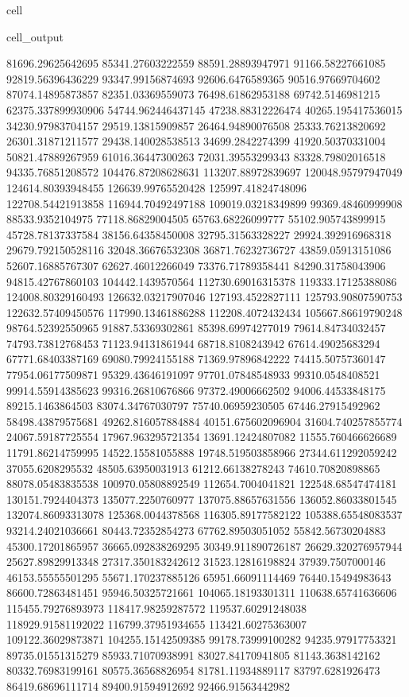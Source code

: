 \documentclass[letterpaper,10pt,english]{jupyterBook}
\begin{document}
\begin{sphinxuseclass}{cell}
\begin{sphinxVerbatimOutput}
\begin{sphinxuseclass}{cell_output}
\begin{sphinxVerbatim}[commandchars=\\\{\}]
81696.29625642695  85341.27603222559  88591.28893947971  91166.58227661085  92819.56396436229  93347.99156874693  92606.6476589365  90516.97669704602  87074.14895873857  82351.03369559073  76498.61862953188  69742.5146981215  62375.337899930906  54744.962446437145  47238.88312226474  40265.195417536015  34230.97983704157  29519.13815909857  26464.94890076508  25333.76213820692  26301.31871211577  29438.140028538513  34699.2842274399  41920.50370331004  50821.47889267959  61016.36447300263  72031.39553299343  83328.79802016518  94335.76851208572  104476.87208628631  113207.88972839697  120048.95797947049  124614.80393948455  126639.99765520428  125997.41824748096  122708.54421913858  116944.70492497188  109019.03218349899  99369.48460999908  88533.9352104975  77118.86829004505  65763.68226099777  55102.905743899915  45728.78137337584  38156.64358450008  32795.31563328227  29924.392916968318  29679.792150528116  32048.36676532308  36871.76232736727  43859.05913151086  52607.16885767307  62627.46012266049  73376.71789358441  84290.31758043906  94815.42767860103  104442.1439570564  112730.69016315378  119333.17125388086  124008.80329160493  126632.03217907046  127193.4522827111  125793.90807590753  122632.57409450576  117990.13461886288  112208.4072432434  105667.86619790248  98764.52392550965  91887.53369302861  85398.69974277019  79614.84734032457  74793.73812768453  71123.94131861944  68718.8108243942  67614.49025683294  67771.68403387169  69080.79924155188  71369.97896842222  74415.50757360147  77954.06177509871  
95329.43646191097  97701.07848548933  99310.0548408521  99914.55914385623  99316.26810676866  97372.49006662502  94006.44533848175  89215.1463864503  83074.34767030797  75740.06959230505  67446.27915492962  58498.43879575681  49262.816057884884  40151.675602096904  31604.740257855774  24067.59187725554  17967.963295721354  13691.12424807082  11555.760466626689  11791.86214759995  14522.15581055888  19748.519503858966  27344.611292059242  37055.6208295532  48505.63950031913  61212.66138278243  74610.70820898865  88078.05483835538  100970.05808892549  112654.7004041821  122548.68547474181  130151.7924404373  135077.2250760977  137075.88657631556  136052.86033801545  132074.86093313078  125368.0044378568  116305.89177582122  105388.65548083537  93214.24021036661  80443.72352854273  67762.89503051052  55842.56730204883  45300.17201865957  36665.092838269295  30349.911890726187  26629.320276957944  25627.89829913348  27317.350183242612  31523.12816198824  37939.7507000146  46153.55555501295  55671.170237885126  65951.66091114469  76440.15494983643  86600.72863481451  95946.50325721661  104065.18193301311  110638.65741636606  115455.79276893973  118417.98259287572  119537.60291248038  118929.91581192022  116799.37951934655  113421.60275363007  109122.36029873871  104255.15142509385  99178.73999100282  94235.97917753321  89735.01551315279  85933.71070938991  83027.84170941805  81143.3638142162  80332.76983199161  80575.36568826954  81781.11934889117  83797.6281926473  86419.68696111714  89400.91594912692  92466.91563442982  

\end{sphinxVerbatim}
\end{sphinxuseclass}
\end{sphinxVerbatimOutput}
\end{sphinxuseclass}
\end{document}
